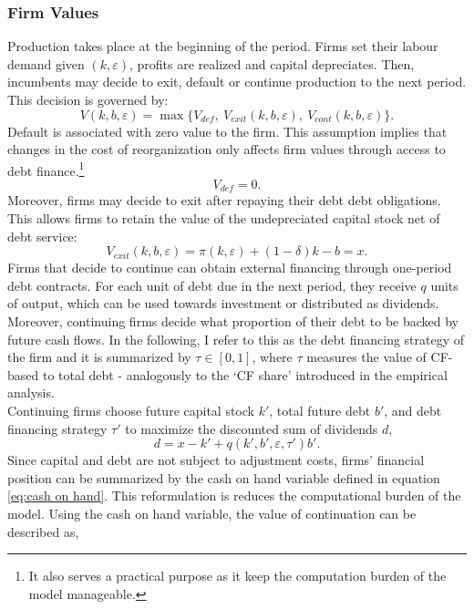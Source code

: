 \documentclass[12pt]{article}
\begin{document}
\subsubsection{Firm Values} \label{sec:Firm Values}
Production takes place at the beginning of the period. Firms set their labour demand given $(k,\varepsilon)$, profits are realized and capital depreciates. Then, incumbents may decide to exit, default or continue production to the next period. This decision is governed by: 
\begin{equation} \label{eq:default decision}
    V(k,b,\varepsilon) = \max \{V_{def}, \  V_{exit}(k,b,\varepsilon),  \ V_{cont}(k,b,\varepsilon) \}.
\end{equation}
Default is associated with zero value to the firm. This assumption implies that changes in the cost of reorganization only affects firm values through access to debt finance.\footnote{It also serves a practical purpose as it keep the computation burden of the model manageable.}
\begin{equation}
    V_{def} = 0.
\end{equation}
Moreover, firms may decide to exit after repaying their debt debt obligations. This allows firms to retain the value of the undepreciated capital stock net of debt service: 
\begin{equation}
    V_{exit}(k, b, \varepsilon) = \pi(k,\varepsilon) + (1-\delta)k - b  = x.
\end{equation}
Firms that decide to continue can obtain external financing through one-period debt contracts. For each unit of debt due in the next period, they receive $q$ units of output, which can be used towards investment or distributed as dividends. Moreover, continuing firms decide what proportion of their debt to be backed by future cash flows. In the following, I refer to this as the debt financing strategy of the firm and it is summarized by $\tau \in [0,1]$, where $\tau$ measures the value of CF-based to total debt - analogously to the `CF share' introduced in the empirical analysis. \vspace{3mm} \\
Continuing firms choose future capital stock $k'$, total future debt $b'$, and debt financing strategy $\tau'$ to maximize the discounted sum of dividends $d$, 
\begin{equation} \label{eq:dividends}
d = x - k' +  q(k',b',\varepsilon, \tau')b'.
\end{equation} 
Since capital and debt are not subject to adjustment costs, firms' financial position can be summarized by the cash on hand variable defined in equation \ref{eq:cash on hand}. This reformulation is reduces the computational burden of the model. Using the cash on hand variable, the value of continuation can be described as,
\end{document}
